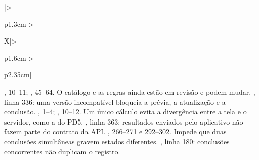 \begin{apendicesenv}
{\begin{xltabular}{\textwidth}{|>{\raggedright\arraybackslash}p{1.3cm}|>{\raggedright\arraybackslash}X|>{\raggedright\arraybackslash}p{1.6cm}|>{\raggedright\arraybackslash}p{2.35cm}|}
		{, 10--11; , 45--64.}
		{O catálogo e as regras ainda estão em revisão e podem mudar.}
		{, linha 336: uma versão incompatível bloqueia a prévia, a atualização e a conclusão.}
		{, 1--4; , 10--12.}
		{Um único cálculo evita a divergência entre a tela e o servidor, como a do PD5.}
		{, linha 363: resultados enviados pelo aplicativo não fazem parte do contrato da API.}
		{, 266--271 e 292--302.}
		{Impede que duas conclusões simultâneas gravem estados diferentes.}
		{, linha 180: conclusões concorrentes não duplicam o registro.}


\end{xltabular}}
\end{apendicesenv}
